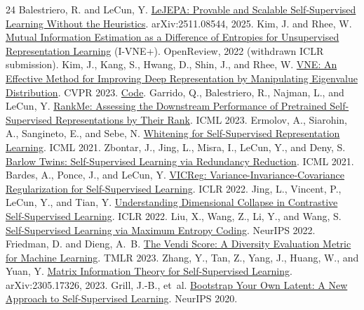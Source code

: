 \documentclass[11pt]{article}
\begin{document}
\begin{thebibliography}{24}
 Balestriero, R. and LeCun, Y. \href{https://arxiv.org/abs/2511.08544}{LeJEPA: Provable and Scalable Self-Supervised Learning Without the Heuristics}. arXiv:2511.08544, 2025.
 Kim, J. and Rhee, W. \href{https://openreview.net/forum?id=J7FaSJw-xCM}{Mutual Information Estimation as a Difference of Entropies for Unsupervised Representation Learning} (I-VNE+). OpenReview, 2022 (withdrawn ICLR submission).
 Kim, J., Kang, S., Hwang, D., Shin, J., and Rhee, W. \href{https://openaccess.thecvf.com/content/CVPR2023/html/Kim_VNE_An_Effective_Method_for_Improving_Deep_Representation_by_Manipulating_CVPR_2023_paper.html}{VNE: An Effective Method for Improving Deep Representation by Manipulating Eigenvalue Distribution}. CVPR 2023. \href{https://github.com/jaeill/CVPR23-VNE}{Code}.
 Garrido, Q., Balestriero, R., Najman, L., and LeCun, Y. \href{https://arxiv.org/abs/2210.02885}{RankMe: Assessing the Downstream Performance of Pretrained Self-Supervised Representations by Their Rank}. ICML 2023.
 Ermolov, A., Siarohin, A., Sangineto, E., and Sebe, N. \href{https://proceedings.mlr.press/v139/ermolov21a.html}{Whitening for Self-Supervised Representation Learning}. ICML 2021.
 Zbontar, J., Jing, L., Misra, I., LeCun, Y., and Deny, S. \href{https://proceedings.mlr.press/v139/zbontar21a.html}{Barlow Twins: Self-Supervised Learning via Redundancy Reduction}. ICML 2021.
 Bardes, A., Ponce, J., and LeCun, Y. \href{https://openreview.net/forum?id=xm6YD62D1Ub}{VICReg: Variance-Invariance-Covariance Regularization for Self-Supervised Learning}. ICLR 2022.
 Jing, L., Vincent, P., LeCun, Y., and Tian, Y. \href{https://arxiv.org/abs/2110.09348}{Understanding Dimensional Collapse in Contrastive Self-Supervised Learning}. ICLR 2022.
 Liu, X., Wang, Z., Li, Y., and Wang, S. \href{https://proceedings.neurips.cc/paper_files/paper/2022/hash/dc709714c52b35f2f34aca2a92b06bc8-Abstract-Conference.html}{Self-Supervised Learning via Maximum Entropy Coding}. NeurIPS 2022.
 Friedman, D. and Dieng, A.~B. \href{https://arxiv.org/abs/2210.02410}{The Vendi Score: A Diversity Evaluation Metric for Machine Learning}. TMLR 2023.
 Zhang, Y., Tan, Z., Yang, J., Huang, W., and Yuan, Y. \href{https://arxiv.org/abs/2305.17326}{Matrix Information Theory for Self-Supervised Learning}. arXiv:2305.17326, 2023.
 Grill, J.-B., et~al. \href{https://arxiv.org/abs/2006.07733}{Bootstrap Your Own Latent: A New Approach to Self-Supervised Learning}. NeurIPS 2020.

\end{thebibliography}
\end{document}
